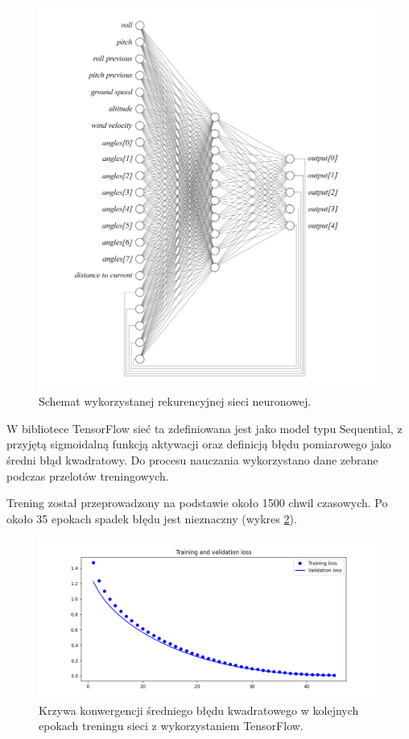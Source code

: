 \documentclass[12pt, a4paper]{article}
\begin{document}
 \begin{figure}[H]
    \centering
    \includegraphics[width=1\textwidth]{siec}
    \caption{Schemat wykorzystanej rekurencyjnej sieci neuronowej.}
    \label{fig:siec}
\end{figure}

W bibliotece TensorFlow sieć ta zdefiniowana jest jako model typu Sequential, z przyjętą sigmoidalną funkcją aktywacji oraz definicją błędu pomiarowego jako średni błąd kwadratowy. Do procesu nauczania wykorzystano dane zebrane podczas przelotów treningowych.

Trening został przeprowadzony na podstawie około 1500 chwil czasowych. Po około 35 epokach spadek błędu jest nieznaczny (wykres \ref{fig:tren1}).

 \begin{figure}[ht]
    \centering
    \includegraphics[width=1\textwidth]{tfloss}
    \caption{Krzywa konwergencji średniego błędu kwadratowego w kolejnych epokach treningu sieci z wykorzystaniem TensorFlow.}
    \label{fig:tren1}
\end{figure}
\end{document}
